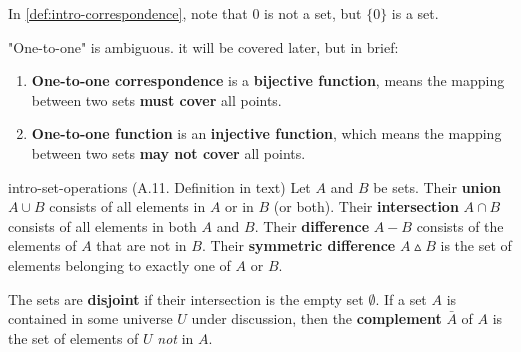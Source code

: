 \documentclass[../src/handouts/main.tex]{subfiles}
\begin{document}
In \cref{def:intro-correspondence}, note that 0 is not a set, but $\{ 0 \}$ is a set.

"One-to-one" is ambiguous. it will be covered later, but in brief:
\begin{enumerate}
  \item \textbf{One-to-one correspondence} is a \textbf{bijective function}, means the mapping between two sets \textbf{must cover} all points.
  \item \textbf{One-to-one function} is an \textbf{injective function}, which means the mapping between two sets \textbf{may not cover} all points.
\end{enumerate}

\begin{definition}{}{intro-set-operations}
  (A.11. Definition in text)
  Let $A$ and $B$ be sets.
  Their \textbf{union} $A \cup B$ consists of all elements in $A$ or in $B$ (or both).
  Their \textbf{intersection} $A \cap B$ consists of all elements in both $A$ and $B$.
  Their \textbf{difference} $A - B$ consists of the elements of $A$ that are not in $B$.
  Their \textbf{symmetric difference} $A \smalltriangleup B$ is the set of elements belonging to exactly one of $A$ or $B$.

  The sets are \textbf{disjoint} if their intersection is the empty set $\emptyset$.
  If a set $A$ is contained in some universe $U$ under discussion, then the \textbf{complement} $\bar A$ of $A$ is the set of elements of $U$ \textit{not} in $A$.

  \centering
  \centering
\end{definition}
\end{document}
